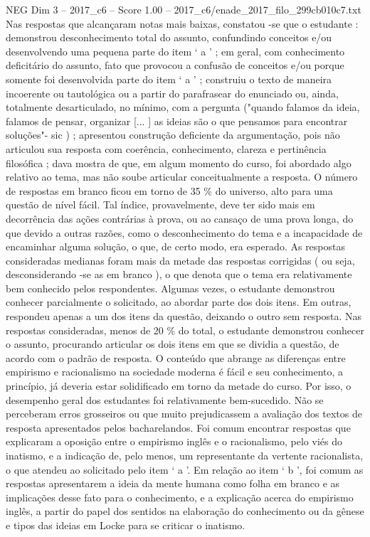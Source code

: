 \begin{textsample}{NEG Dim 3 – 2017\_c6 – Score 1.00 – 2017\_c6/enade\_2017\_filo\_299cb010c7.txt}
Nas respostas que alcançaram notas mais baixas, constatou -se que o estudante : demonstrou desconhecimento total do assunto, confundindo conceitos e/ou desenvolvendo uma pequena parte do item ‘ a ’ ; em geral, com conhecimento deficitário do assunto, fato que provocou a confusão de conceitos e/ou porque somente foi desenvolvida parte do item ‘ a ’ ; construiu o texto de maneira incoerente ou tautológica ou a partir do parafrasear do enunciado ou, ainda, totalmente desarticulado, no mínimo, com a pergunta ("quando falamos da ideia, falamos de pensar, organizar [... ] as ideias são o que pensamos para encontrar soluções"- sic ) ; apresentou construção deficiente da argumentação, pois não articulou sua resposta com coerência, conhecimento, clareza e pertinência filosófica ; dava mostra de que, em algum momento do curso, foi abordado algo relativo ao tema, mas não soube articular conceitualmente a resposta.
O número de respostas em branco ficou em torno de 35 \% do universo, alto para uma questão de nível fácil.
Tal índice, provavelmente, deve ter sido mais em decorrência das ações contrárias à prova, ou ao cansaço de uma prova longa, do que devido a outras razões, como o desconhecimento do tema e a incapacidade de encaminhar alguma solução, o que, de certo modo, era esperado.
As respostas consideradas medianas foram mais da metade das respostas corrigidas ( ou seja, desconsiderando -se as em branco ), o que denota que o tema era relativamente bem conhecido pelos respondentes.
Algumas vezes, o estudante demonstrou conhecer parcialmente o solicitado, ao abordar parte dos dois itens.
Em outras, respondeu apenas a um dos itens da questão, deixando o outro sem resposta.
Nas respostas consideradas, menos de 20 \% do total, o estudante demonstrou conhecer o assunto, procurando articular os dois itens em que se dividia a questão, de acordo com o padrão de resposta.
O conteúdo que abrange as diferenças entre empirismo e racionalismo na sociedade moderna é fácil e seu conhecimento, a princípio, já deveria estar solidificado em torno da metade do curso.
Por isso, o desempenho geral dos estudantes foi relativamente bem-sucedido.
Não se perceberam erros grosseiros ou que muito prejudicassem a avaliação dos textos de resposta apresentados pelos bacharelandos.
Foi comum encontrar respostas que explicaram a oposição entre o empirismo inglês e o racionalismo, pelo viés do inatismo, e a indicação de, pelo menos, um representante da vertente racionalista, o que atendeu ao solicitado pelo item ‘ a ’.
Em relação ao item ‘ b ’, foi comum as respostas apresentarem a ideia da mente humana como folha em branco e as implicações desse fato para o conhecimento, e a explicação acerca do empirismo inglês, a partir do papel dos sentidos na elaboração do conhecimento ou da gênese e tipos das ideias em Locke para se criticar o inatismo.

\end{textsample}
